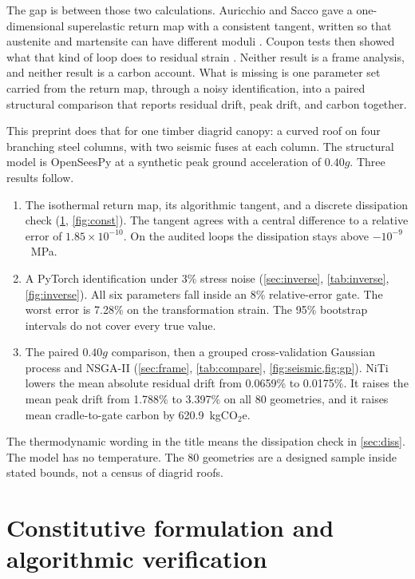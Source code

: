 \documentclass[10pt,a4paper]{article}
\begin{document}
The gap is between those two calculations. Auricchio and Sacco gave a one-dimensional superelastic return map with a consistent tangent, written so that austenite and martensite can have different moduli \cite{auricchio1997}. Coupon tests then showed what that kind of loop does to residual strain \cite{desroches2004}. Neither result is a frame analysis, and neither result is a carbon account. What is missing is one parameter set carried from the return map, through a noisy identification, into a paired structural comparison that reports residual drift, peak drift, and carbon together.

This preprint does that for one timber diagrid canopy: a curved roof on four branching steel columns, with two seismic fuses at each column. The structural model is OpenSeesPy \cite{zhu2018,mckenna2011} at a synthetic peak ground acceleration of $0.40g$. Three results follow.

\begin{enumerate}
  \item The isothermal return map, its algorithmic tangent, and a discrete dissipation check (\cref{sec:const}, \cref{fig:const}). The tangent agrees with a central difference to a relative error of $1.85\times 10^{-10}$. On the audited loops the dissipation stays above $-10^{-9}$~MPa.
  \item A PyTorch identification under 3\% stress noise (\cref{sec:inverse}, \cref{tab:inverse}, \cref{fig:inverse}). All six parameters fall inside an 8\% relative-error gate. The worst error is 7.28\% on the transformation strain. The 95\% bootstrap intervals do not cover every true value.
  \item The paired $0.40g$ comparison, then a grouped cross-validation Gaussian process and NSGA-II \cite{rasmussen2006,deb2002} (\cref{sec:frame}, \cref{tab:compare}, \cref{fig:seismic,fig:gp}). NiTi lowers the mean absolute residual drift from 0.0659\% to 0.0175\%. It raises the mean peak drift from 1.788\% to 3.397\% on all 80 geometries, and it raises mean cradle-to-gate carbon by 620.9~kgCO$_2$e.
\end{enumerate}

The thermodynamic wording in the title means the dissipation check in \cref{sec:diss}. The model has no temperature. The 80 geometries are a designed sample inside stated bounds, not a census of diagrid roofs.

\section{Constitutive formulation and algorithmic verification}
\label{sec:const}
\end{document}

